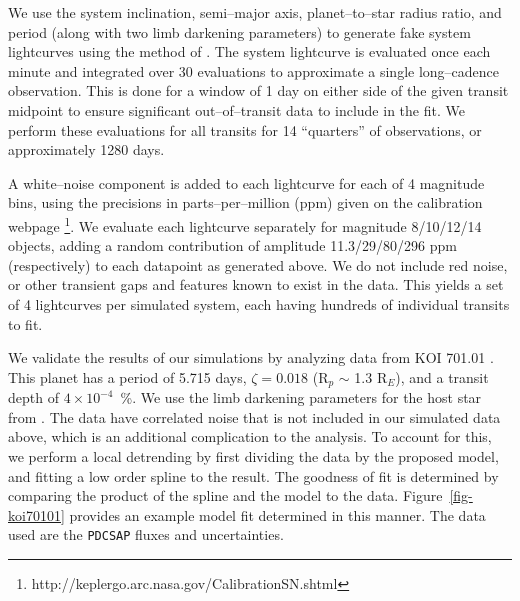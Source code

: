We use the system inclination, semi--major axis, planet--to--star
radius ratio, and period (along with two limb darkening parameters) to
generate fake system lightcurves using the method of
\cite{2002ApJ...580L.171M}.  The system lightcurve is evaluated once
each minute and integrated over 30 evaluations to approximate a single
\kepler long--cadence observation.  This is done for a window of 1 day
on either side of the given transit midpoint to ensure significant
out--of--transit data to include in the fit.  We perform these
evaluations for all transits for 14 ``quarters'' of \kepler
observations, or approximately 1280 days.

A white--noise component is added to each lightcurve for each of 4
magnitude bins, using the precisions in parts--per--million (ppm)
given on the \kepler calibration
webpage \footnote{http://keplergo.arc.nasa.gov/CalibrationSN.shtml}.
We evaluate each lightcurve separately for magnitude 8/10/12/14
objects, adding a random contribution of amplitude 11.3/29/80/296 ppm
(respectively) to each datapoint as generated above.  We do not
include red noise, or other transient gaps and features known to exist
in the \kepler data.  This yields a set of 4 lightcurves per simulated
system, each having hundreds of individual transits to fit.

\medskip
{\centerline{}}
\smallskip

We validate the results of our simulations by analyzing \kepler data
from KOI 701.01 \citep[Kepler 62--b;][]{2013arXiv1304.7387B}.  This
planet has a period of 5.715 days, $\zeta = 0.018$ (R$_p$ $\sim$ 1.3
R$_E$), and a transit depth of $4 \times 10^{-4}$~\%.  We use the limb
darkening parameters for the host star from
\cite{2010A&A...510A..21S}.  The \kepler data have correlated noise
that is not included in our simulated data above, which is an
additional complication to the analysis.  To account for this, we
perform a local detrending by first dividing the data by the proposed
model, and fitting a low order spline to the result.  The goodness of
fit is determined by comparing the product of the spline and the model
to the data.  Figure~\ref{fig-koi70101} provides an example model fit
determined in this manner.  The data used are the {\tt PDCSAP} fluxes
and uncertainties.

